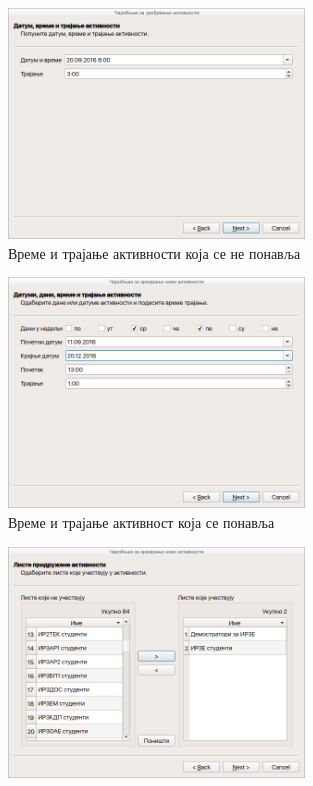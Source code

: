 \documentclass[a4paper, 12pt, diplomski]{etfcyr}
\begin{document}
\begin{justify}
\begin{figure}[H]
						\label{figure:repetitive_name_and_type}
					\end{figure}
					\begin{figure}[H]
						\begin{center}
							\includegraphics[width=0.70\textwidth]{manual/activity_wizard_time.png}
						\end{center}
						\caption{Време и трајање активности која се не понавља}
						\label{figure:single_time}
					\end{figure}
					\begin{figure}[H]
						\begin{center}
							\includegraphics[width=0.70\textwidth]{manual/activity_wizard_time_slots.png}
						\end{center}
						\caption{Време и трајање активност која се понавља}
						\label{figure:multiple_time}
					\end{figure}
					\begin{figure}[H]
						\begin{center}
							\includegraphics[width=0.70\textwidth]{manual/activity_wizard_lists.png}

\end{center}
\end{figure}
\end{justify}
\end{document}

